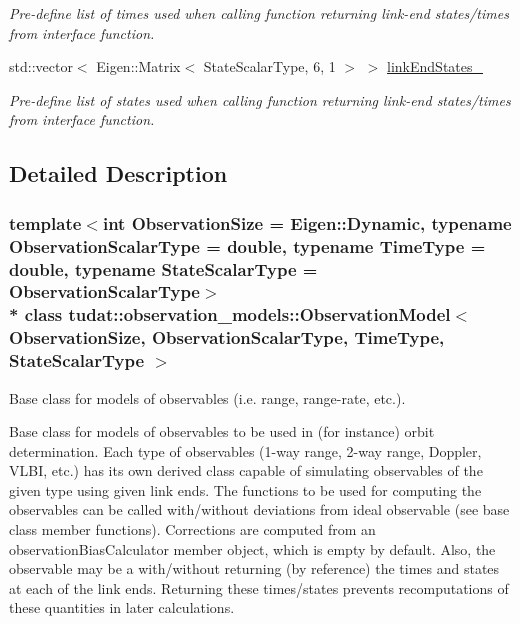 \begin{DoxyCompactItemize}
\begin{DoxyCompactList}\small\item\em Pre-\/define list of times used when calling function returning link-\/end states/times from interface function. \end{DoxyCompactList}\item 
std\+::vector$<$ Eigen\+::\+Matrix$<$ State\+Scalar\+Type, 6, 1 $>$ $>$ \hyperlink{classtudat_1_1observation__models_1_1ObservationModel_af9aa09c76e02b72c4bb882d5723d7d2e}{link\+End\+States\+\_\+}\hypertarget{classtudat_1_1observation__models_1_1ObservationModel_af9aa09c76e02b72c4bb882d5723d7d2e}{}\label{classtudat_1_1observation__models_1_1ObservationModel_af9aa09c76e02b72c4bb882d5723d7d2e}

\begin{DoxyCompactList}\small\item\em Pre-\/define list of states used when calling function returning link-\/end states/times from interface function. \end{DoxyCompactList}\end{DoxyCompactItemize}


\subsection{Detailed Description}
\subsubsection*{template$<$int Observation\+Size = Eigen\+::\+Dynamic, typename Observation\+Scalar\+Type = double, typename Time\+Type = double, typename State\+Scalar\+Type = Observation\+Scalar\+Type$>$\\*
class tudat\+::observation\+\_\+models\+::\+Observation\+Model$<$ Observation\+Size, Observation\+Scalar\+Type, Time\+Type, State\+Scalar\+Type $>$}

Base class for models of observables (i.\+e. range, range-\/rate, etc.). 

Base class for models of observables to be used in (for instance) orbit determination. Each type of observables (1-\/way range, 2-\/way range, Doppler, V\+L\+BI, etc.) has its own derived class capable of simulating observables of the given type using given link ends. The functions to be used for computing the observables can be called with/without deviations from ideal observable (see base class member functions). Corrections are computed from an observation\+Bias\+Calculator member object, which is empty by default. Also, the observable may be a with/without returning (by reference) the times and states at each of the link ends. Returning these times/states prevents recomputations of these quantities in later calculations. 

